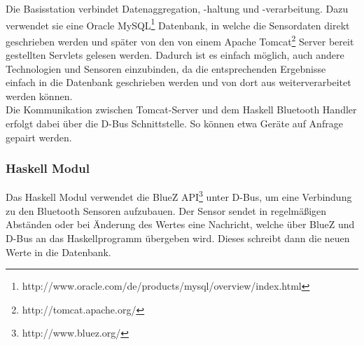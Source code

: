 Die Basisstation verbindet Datenaggregation, -haltung und -verarbeitung. Dazu verwendet sie eine Oracle MySQL\footnote{http://www.oracle.com/de/products/mysql/overview/index.html} Datenbank, in welche die Sensordaten direkt geschrieben werden und später von den von einem Apache Tomcat\footnote{http://tomcat.apache.org/} Server bereit gestellten Servlets gelesen werden. Dadurch ist es einfach möglich, auch andere Technologien und Sensoren einzubinden, da die entsprechenden Ergebnisse einfach in die Datenbank geschrieben werden und von dort aus weiterverarbeitet werden können.\\
Die Kommunikation zwischen Tomcat-Server und dem Haskell Bluetooth Handler erfolgt dabei über die D-Bus Schnittstelle. So können etwa Geräte auf Anfrage gepairt werden.
\subsubsection{Haskell Modul}
Das Haskell Modul verwendet die BlueZ API\footnote{http://www.bluez.org/} unter D-Bus, um eine Verbindung zu den Bluetooth Sensoren aufzubauen. Der Sensor sendet in regelmäßigen Abständen oder bei Änderung des Wertes eine Nachricht, welche über BlueZ und D-Bus an das Haskellprogramm übergeben wird. Dieses schreibt dann die neuen Werte in die Datenbank.
